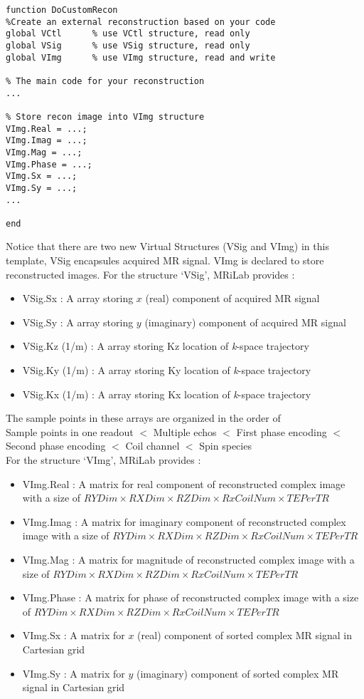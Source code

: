 \documentclass{book}%
\begin{document}
\begin{verbatim}
function DoCustomRecon
%Create an external reconstruction based on your code
global VCtl      % use VCtl structure, read only
global VSig      % use VSig structure, read only
global VImg      % use VImg structure, read and write

% The main code for your reconstruction
...

% Store recon image into VImg structure
VImg.Real = ...;
VImg.Imag = ...;
VImg.Mag = ...;
VImg.Phase = ...;
VImg.Sx = ...;
VImg.Sy = ...;
...

end
\end{verbatim}

Notice that there are two new Virtual Structures (VSig and VImg) in this template, VSig encapsules acquired MR signal. VImg is declared to store reconstructed images. For the structure `VSig', MRiLab provides :

\begin{itemize}
	\item VSig.Sx : A array storing $x$ (real) component of acquired MR signal
	\item VSig.Sy : A array storing $y$ (imaginary) component of acquired MR signal
	\item VSig.Kz (1/m) : A array storing Kz location of \textit{k}-space trajectory
	\item VSig.Ky (1/m) : A array storing Ky location of \textit{k}-space trajectory
	\item VSig.Kx (1/m) : A array storing Kx location of \textit{k}-space trajectory
\end{itemize}

The sample points in these arrays are organized in the order of \\

Sample points in one readout $<$ Multiple echos $<$ First phase encoding $<$ Second phase encoding $<$ Coil channel $<$ Spin species \\

For the structure `VImg', MRiLab provides : 
\begin{itemize}
	\item VImg.Real : A matrix for real component of reconstructed complex image with a size of $ RYDim \times RXDim \times RZDim \times RxCoilNum \times TEPerTR$
	\item VImg.Imag : A matrix for imaginary component of reconstructed complex image with a size of $ RYDim \times RXDim \times RZDim \times RxCoilNum \times TEPerTR$
	\item VImg.Mag : A matrix for magnitude of reconstructed complex image with a size of $ RYDim \times RXDim \times RZDim \times RxCoilNum \times TEPerTR$
	\item VImg.Phase : A matrix for phase of reconstructed complex image with a size of $ RYDim \times RXDim \times RZDim \times RxCoilNum \times TEPerTR$
	\item VImg.Sx : A matrix for $x$ (real) component of sorted complex MR signal in Cartesian grid
	\item VImg.Sy : A matrix for $y$ (imaginary) component of sorted complex MR signal in Cartesian grid
\end{itemize}
\end{document}
